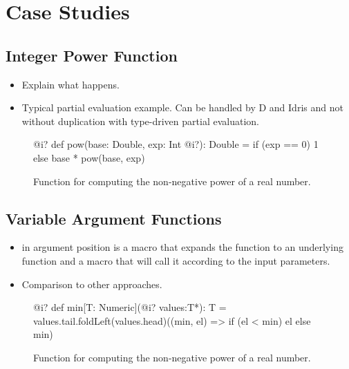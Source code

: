 \section{Case Studies}
\label{sct:case-studies}



\subsection{Integer Power Function}
\begin{itemize}
  \item Explain what happens.
  \item Typical partial evaluation example. Can be handled by D and Idris and not without duplication with type-driven partial evaluation.
\end{itemize}

\begin{figure}
\begin{listing}
@i? def pow(base: Double, exp: Int @i?): Double =
  if (exp == 0) 1 else base * pow(base, exp)
\end{listing}
\caption{\label{lst:vector_deep_ir} Function for computing the non-negative power of a real number.}
\end{figure}



\subsection{Variable Argument Functions}

\begin{itemize}
  \item {} in argument position is a macro that expands the function to an underlying function  and a macro that will call it according to the input parameters.
  \item Comparison to other approaches.
\end{itemize}

\begin{figure}
\begin{listing}
@i? def min[T: Numeric](@i? values:T*): T =
  values.tail.foldLeft(values.head)((min, el) => if (el < min) el else min)
\end{listing}
\caption{\label{lst:vector_deep_ir} Function for computing the non-negative power of a real number.}
\end{figure}



